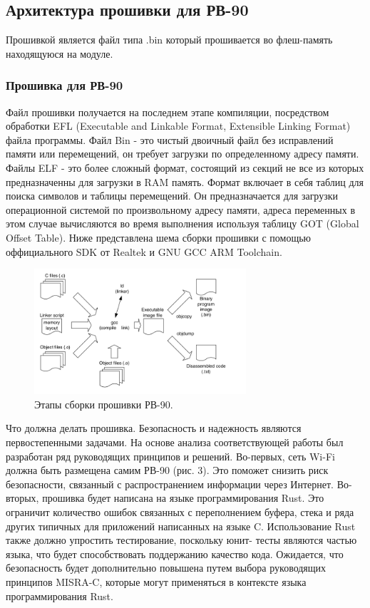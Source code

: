 \newpage
\subsection{Архитектура прошивки для РВ-90}
Прошивкой является файл типа .bin который прошивается во флеш-память находящуюся на модуле.

\subsubsection{ Прошивка для РВ-90 }
Файл прошивки получается на последнем этапе компиляции, посредством обработки EFL (Executable and Linkable Format, Extensible Linking Format) файла программы. 
Файл Bin - это чистый двоичный файл без исправлений памяти или перемещений, он требует загрузки по определенному адресу памяти.
Файлы ELF - это более сложный формат, состоящий из секций не все из которых предназначенны для загрузки в RAM память. Формат включает в себя таблиц для поиска символов и таблицы перемещений. Он предназначается для загрузки операционной системой по произвольному адресу памяти, адреса переменных в этом случае вычисляются во время выполнения используя таблицу GOT (Global Offset Table). 
Ниже представлена шема сборки прошивки с помощью оффициального SDK от Realtek и GNU GCC ARM Toolchain.
 
\begin{figure}[h!]
    \centering
    \includegraphics[width=0.7\textwidth]{compilation_steps_firmware.png}
    \caption{Этапы сборки прошивки РВ-90.}
\end{figure}
 

Что должна делать прошивка.
Безопасность и надежность являются первостепенными задачами. На основе анализа соответствующей работы был разработан ряд руководящих принципов и решений. Во-первых, сеть Wi-Fi должна быть размещена самим РВ-90 (рис. 3). Это поможет снизить риск безопасности, связанный с распространением информации через Интернет. Во-вторых, прошивка будет написана на языке программирования Rust. Это ограничит количество ошибок связанных с переполнением буфера, стека и ряда других типичных для приложений написанных на языке C. Использование Rust также должно упростить тестирование, поскольку юнит- тесты являются частью языка, что будет способствовать поддержанию качество кода. Ожидается, что безопасность будет дополнительно повышена путем выбора руководящих принципов MISRA-C, которые могут применяться в контексте языка программирования Rust. 

